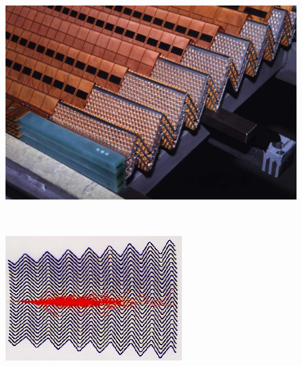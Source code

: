 \begin{english}
\begin{figure}[hbtp]
\begin{minipage}[b]{.59\textwidth}
    \begin{center}
    \includegraphics[width=\textwidth]{larpic}
    \end{center}
\end{minipage}
~\begin{minipage}[b]{.4\textwidth}
    \begin{center}
    \includegraphics[width=\textwidth]{shower}
    \end{center}
\end{minipage}

\begin{minipage}[t]{.59\textwidth}
    \begin{center}
    \end{center}
\end{minipage}
~\begin{minipage}[t]{.4\textwidth}
    \begin{center}
    \end{center}
\end{minipage}


\end{figure}
\end{english}
